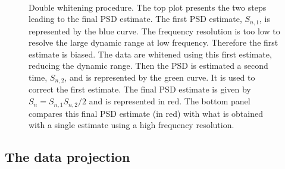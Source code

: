 \begin{figure}
  \center
   \\
  \caption{Double whitening procedure. The top plot presents the two steps leading to the final PSD estimate. The first PSD estimate, $S_{n,1}$, is represented by the blue curve. The frequency resolution is too low to resolve the large dynamic range at low frequency. Therefore the first estimate is biased. The data are whitened using this first estimate, reducing the dynamic range. Then the PSD is estimated a second time, $S_{n,2}$, and is represented by the green curve. It is used to correct the first estimate. The final PSD estimate is given by $S_n=S_{n,1}S_{n,2}/2$ and is represented in red. The bottom panel compares this final PSD estimate (in red) with what is obtained with a single estimate using a high frequency resolution.}
  \label{fig:doublewhite}
\end{figure}







\subsection{The data projection} \label{sec:algorithm:projection}

